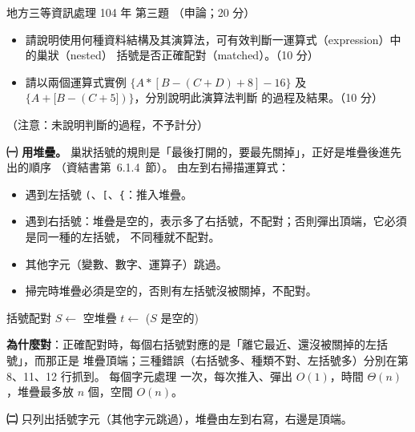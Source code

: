 \begin{pastexam}[label={px:df3-104-ds-03}]{地方三等資訊處理 104 年 第三題}
（申論；20 分）

\begin{itemize}[leftmargin=2em, labelsep=0.3em, itemsep=2pt]
\item[㈠] 請說明使用何種資料結構及其演算法，可有效判斷一運算式（expression）中的巢狀（nested）
括號是否正確配對（matched）。（10 分）
\item[㈡] 請以兩個運算式實例 $\{A*[B-(C+D)+8]-16\}$ 及 $\{A+[B-(C+5])\}$，分別說明此演算法判斷
的過程及結果。（10 分）
\end{itemize}
（注意：未說明判斷的過程，不予計分）
\end{pastexam}

\begin{pastsoln}
\textbf{㈠ 用堆疊。} 巢狀括號的規則是「最後打開的，要最先關掉」，正好是堆疊後進先出的順序
（資結書第~6.1.4~節）。 由左到右掃描運算式：
\begin{itemize}[nosep]
\item 遇到左括號 \texttt{(}、\texttt{[}、\texttt{\{}：推入堆疊。
\item 遇到右括號：堆疊是空的，表示多了右括號，不配對；否則彈出頂端，它必須是同一種的左括號，
不同種就不配對。
\item 其他字元（變數、數字、運算子）跳過。
\item 掃完時堆疊必須是空的，否則有左括號沒被關掉，不配對。
\end{itemize}
\begin{pseudo}{括號配對}
    \State $S \gets$ 空堆疊
            \State {}
                \State \Return \FALSE {}
            \EndIf
            \State $t \gets$ 
                \State \Return \FALSE {}
            \EndIf
        \EndIf
    \EndFor
    \State \Return ($S$ 是空的) 
\EndFunction
\end{pseudo}
\textbf{為什麼對}：正確配對時，每個右括號對應的是「離它最近、還沒被關掉的左括號」，而那正是
堆疊頂端；三種錯誤（右括號多、種類不對、左括號多）分別在第 8、11、12 行抓到。 每個字元處理
一次，每次推入、彈出 $O(1)$，時間 $\Theta(n)$，堆疊最多放 $n$ 個，空間 $O(n)$。

\textbf{㈡} 只列出括號字元（其他字元跳過），堆疊由左到右寫，右邊是頂端。


\end{pastsoln}
